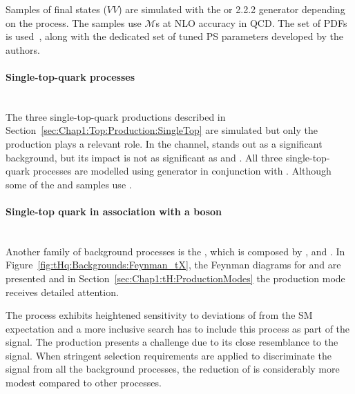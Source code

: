 Samples of \diboson final states (\(VV\)) are simulated with the
\SHERPA[2.2.1] or 2.2.2 generator depending on the process.
The samples use  $\mathcal{M}$s at NLO accuracy in QCD.
The \NNPDF[3.0nnlo] set of PDFs is used~\cite{Ball:2014uwa}, along with the
dedicated set of tuned PS parameters developed by the
\SHERPA authors.



\paragraph{Single-top-quark processes}\mbox{}\\
The three single-top-quark productions described in Section~\ref{sec:Chap1:Top:Production:SingleTop}
are simulated but only the \tW production plays a relevant role.  In the \dilepOStau channel, 
\tW stands out as a significant background, but its impact is not as significant as \ttbar and \Zjets.
All three single-top-quark processes are modelled using \POWHEGBOX[v2]
generator in conjunction with \PYTHIA[8]. Although some of the \tW and \tchannel samples 
use \POWHER[7]. 


\paragraph{Single-top quark in association with a boson}\mbox{}\\
Another family of background processes is the \tX, which is composed
by \tZq, \tWZ and \tWH. In Figure~\ref{fig:tHq:Backgrounds:Feynman_tX},
the Feynman diagrams for \tZq and \tWZ are presented and
in Section~\ref{sec:Chap1:tH:ProductionModes} the \tWH production mode
receives detailed attention. %

The \tWH process exhibits heightened sensitivity to deviations of \yt from the SM expectation
and a more inclusive \tH search has to include this process as part of the signal.
The \tZq production presents a challenge due to its close resemblance to the \tHq signal.
When stringent selection requirements are applied to 
discriminate the signal from all the background processes, the reduction of \tZq is considerably 
more modest compared to other processes.

